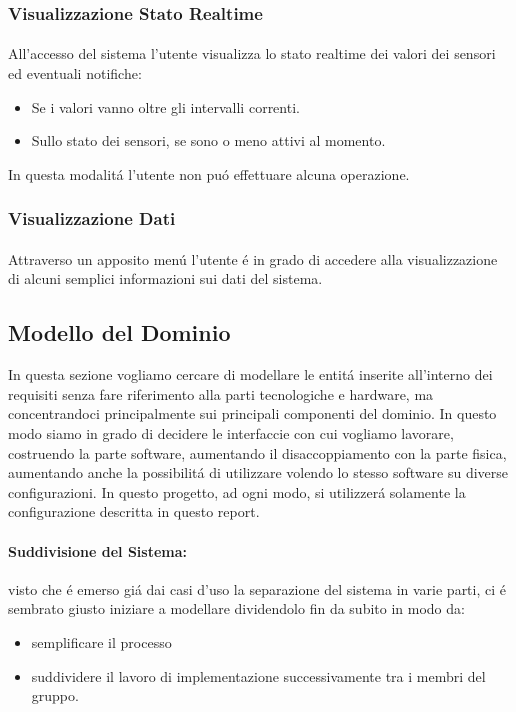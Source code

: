 \subsubsection{Visualizzazione Stato Realtime}

\paragraph{} All'accesso del sistema l'utente visualizza lo stato realtime dei valori dei sensori ed eventuali notifiche:
\begin{itemize}
  \item Se i valori vanno oltre gli intervalli correnti.
  \item Sullo stato dei sensori, se sono o meno attivi al momento.
\end{itemize}

In questa modalit\'a l'utente non pu\'o effettuare alcuna operazione.

\subsubsection{Visualizzazione Dati}

\paragraph{} Attraverso un apposito men\'u l'utente \'e in grado di accedere alla visualizzazione di alcuni semplici informazioni sui dati del sistema.

\newpage

\subsection{Modello del Dominio}

In questa sezione vogliamo cercare di modellare le entit\'a inserite all'interno dei requisiti senza fare riferimento alla parti tecnologiche e hardware, ma concentrandoci principalmente sui principali componenti del dominio. In questo modo siamo in grado di decidere le interfaccie con cui vogliamo lavorare, costruendo la parte software, aumentando il disaccoppiamento con la parte fisica, aumentando anche la possibilit\'a di utilizzare volendo lo stesso software su diverse configurazioni. In questo progetto, ad ogni modo, si utilizzer\'a solamente la configurazione descritta in questo report.

\paragraph{Suddivisione del Sistema:} visto che \'e emerso gi\'a dai casi d'uso la separazione del sistema in varie parti, ci \'e sembrato giusto iniziare a modellare dividendolo fin da subito in modo da:
\begin{itemize}
  \item semplificare il processo
  \item suddividere il lavoro di implementazione successivamente tra i membri del gruppo.
\end{itemize}

